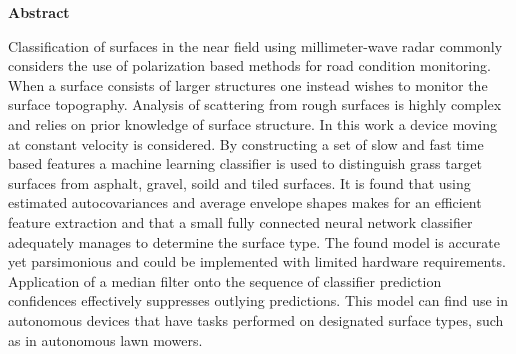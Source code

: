 \newenvironment{abstract}%
    {\cleardoublepage\thispagestyle{empty}\null\vfill\begin{center}%
    \bfseries{\textsf{Abstract}}\end{center}}%
    {\vfill\null}
\begin{abstract}
Classification of surfaces in the near field using millimeter-wave radar commonly considers the use of polarization based methods for road condition monitoring. When a surface consists of larger structures one instead wishes to monitor the surface topography. Analysis of scattering from rough surfaces is highly complex and relies on prior knowledge of surface structure. In this work a device moving at constant velocity is considered. By constructing a set of slow and fast time based features a machine learning classifier is used to distinguish grass target surfaces from asphalt, gravel, soild and tiled surfaces. It is found that using estimated autocovariances and average envelope shapes makes for an efficient feature extraction and that a small fully connected neural network classifier adequately manages to determine the surface type. The found model is accurate yet parsimonious and could be implemented with limited hardware requirements. Application of a median filter onto the sequence of classifier prediction confidences effectively suppresses outlying predictions. This model can find use in autonomous devices that have tasks performed on designated surface types, such as in autonomous lawn mowers. 
	


\end{abstract}
